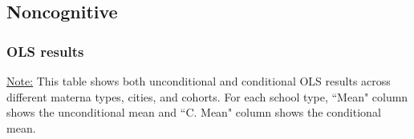 \documentclass[11pt]{article}
\begin{document}
\subsection{Noncognitive}

\subsubsection{OLS results}
\begin{table}[H]
\begin{center}
	\caption{OLS Results} \label{table:OLS-N}
	\end{center}
	\footnotesize
\underline{Note:} This table shows both unconditional and conditional OLS results across different materna types, cities, and cohorts. For each school type, ``Mean" column shows the unconditional mean and ``C. Mean" column shows the conditional mean. 

\end{table}

\end{document}
